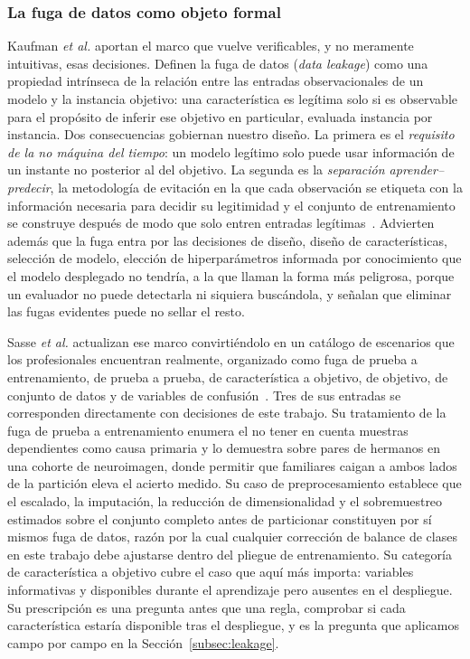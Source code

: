 \documentclass[conference]{IEEEtran}
\begin{document}
\subsubsection{La fuga de datos como objeto formal}
Kaufman \textit{et al.} aportan el marco que vuelve verificables, y no
meramente intuitivas, esas decisiones. Definen la fuga de datos (\emph{data
leakage}) como una propiedad intr\'inseca de la relaci\'on entre las
entradas observacionales de un modelo y la instancia objetivo: una
caracter\'istica es leg\'itima solo si es observable para el prop\'osito de
inferir ese objetivo en particular, evaluada instancia por instancia. Dos
consecuencias gobiernan nuestro dise\~no. La primera es el \emph{requisito
de la no m\'aquina del tiempo}: un modelo leg\'itimo solo puede usar
informaci\'on de un instante no posterior al del objetivo. La segunda es la
\emph{separaci\'on aprender--predecir}, la metodolog\'ia de evitaci\'on en
la que cada observaci\'on se etiqueta con la informaci\'on necesaria para
decidir su legitimidad y el conjunto de entrenamiento se construye despu\'es
de modo que solo entren entradas leg\'itimas~\cite{kaufman_leakage_2011}.
Advierten adem\'as que la fuga entra por las decisiones de dise\~no, 
dise\~no de caracter\'isticas, selecci\'on de modelo, elecci\'on de
hiperpar\'ametros informada por conocimiento que el modelo desplegado no
tendr\'ia, a la que llaman la forma m\'as peligrosa, porque un evaluador
no puede detectarla ni siquiera bus\-c\'an\-do\-la, y se\~nalan que eliminar
las fugas evidentes puede no sellar el resto.

Sasse \textit{et al.} actualizan ese marco convirti\'endolo en un
cat\'alogo de escenarios que los profesionales encuentran realmente,
organizado como fuga de prueba a entrenamiento, de prueba a prueba, de
caracter\'istica a objetivo, de objetivo, de conjunto de datos y de
variables de confusi\'on~\cite{sasse_leakage_2025}. Tres de sus entradas se
corresponden directamente con decisiones de este trabajo. Su tratamiento de
la fuga de prueba a entrenamiento enumera el no tener en cuenta muestras
dependientes como causa primaria y lo demuestra sobre pares de hermanos en
una cohorte de neuroimagen, donde permitir que familiares caigan a ambos
lados de la partici\'on eleva el acierto medido. Su caso de preprocesamiento
establece que el escalado, la imputaci\'on, la reducci\'on de
dimensionalidad y el sobremuestreo estimados sobre el conjunto completo
antes de particionar constituyen por s\'i mismos fuga de datos, raz\'on por
la cual cualquier correcci\'on de balance de clases en este trabajo debe
ajustarse dentro del pliegue de entrenamiento. Su categor\'ia de
caracter\'istica a objetivo cubre el caso que aqu\'i m\'as importa:
variables informativas y disponibles durante el aprendizaje pero ausentes en
el despliegue. Su prescripci\'on es una pregunta antes que una regla, 
comprobar si cada caracter\'istica estar\'ia disponible tras el despliegue, y es la pregunta que aplicamos campo por campo en la
Secci\'on~\ref{subsec:leakage}.
\end{document}

